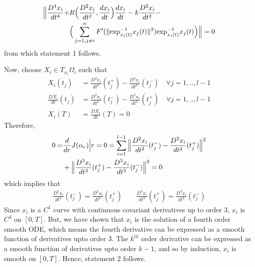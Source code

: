 \documentclass[letterpaper, 10 pt, conference]{ieeeconf}  %
\begin{document}
\begin{equation*}
\begin{split}
\Big\| \frac{D^4x_i}{dt^4} +& R \Big( \frac{D^2x_i}{dt^2}, \frac{d x_i}{d t} \Big) \frac{d x_i}{d t} - k\frac{D^2x_i}{dt^2} - \\  & \Big( \sum\limits_{j=1, j \neq i}^{n} F'(\| \hbox{exp}^{-1}_{x_{i}(t)}x_j(t)\|^2)\hbox{exp}^{-1}_{x_{i}(t)}x_j(t) \Big) \Big\| = 0
\end{split}
\end{equation*}
from which statement 1 follows. \par
Now, choose $X_i \in T_{x_i}\Omega_i$ such that \\
\begin{equation*}
\begin{split}
X_i(t_j) &= \frac{D^3x_i}{dt^3}(t_j^+) - \frac{D^3x_i}{dt^3}(t_j^-) \quad \forall j = 1,..,l-1 \\
\frac{DX_i}{dt}(t_j) &= \frac{D^2x_i}{dt^2}(t_j^-) - \frac{D^2x_i}{dt^2}(t_j^+) \quad \forall j = 1,..,l-1 \\
X_i(T) &= \frac{DX_i}{dt}(T) = 0
\end{split}
\end{equation*}
Therefore,
\begin{equation*}
\begin{split}
0=&\frac{d}{dr}J(\alpha_r)\Big{|}{r=0}=\sum_{i=1}^{l-1} \Big \| \frac{D^2x_i}{dt^2}(t_j^-) - \frac{D^2x_i}{dt^2}(t_j^+) \Big \|^2 \\ &+ \Big \| \frac{D^3x_i}{dt^3}(t_j^+) - \frac{D^3x_i}{dt^3}(t_j^-) \Big \|^2 =  0
\end{split}
\end{equation*}
which implies that
\begin{equation*}
\begin{split}
\frac{D^2x_i}{dt^2}(t_j^-) = \frac{D^2x_i}{dt^2}(t_j^+) \qquad \frac{D^3x_i}{dt^3}(t_j^+) = \frac{D^3x_i}{dt^3}(t_j^-)
\end{split}
\end{equation*}
Since $x_i$ is a $C^1$ curve with continuous covariant derivatives  up to order 3, $x_i$ is $C^3$ on $[0,T]$. But, we have shown that $x_i$ is the solution of a fourth order smooth ODE, which means the fourth derivative can be expressed as a smooth function of derivatives upto order 3. The $k^{th}$ order derivative can be expressed as a smooth function of derivatives upto order $k-1$, and so by induction, $x_i$ is smooth on $[0,T]$. Hence, statement 2 follows. 
\end{document}
